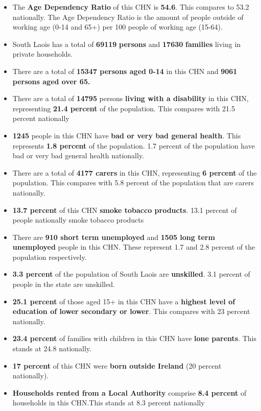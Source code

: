 \documentclass{article}
\begin{document}
\begin{itemize}

\item The \textbf{Age Dependency Ratio} of this CHN is  \textbf{54.6}. This compares to 53.2 nationally. The Age Dependency Ratio is the amount of people outside of working age (0-14 and 65+) per 100 people of working age (15-64). 

\item South Laois has a total of \textbf{\num{69119}} \textbf{persons} and  \textbf{\num{17630}} \textbf{families} living in private households.

\item There are a total of \textbf{\num{15347} persons aged 0-14} in this CHN and \textbf{\num{9061} persons aged over 65.} 

\item There are a total of \textbf{\num{14795}} persons \textbf{living with a disability} in this CHN, representing \textbf{21.4 percent} of the population. This compares with  21.5 percent nationally

\item \textbf{\num{1245}} people in this CHN have \textbf{bad or very bad general health}. This represents \textbf{1.8 percent} of the population. 1.7 percent of the population have bad or very bad general health nationally. 

\item There are a total of \textbf{\num{4177} carers} in this CHN, representing \textbf{6 percent} of the population. This compares with 5.8 percent of the population that are carers nationally. 

\item \textbf{13.7 percent} of this CHN \textbf{smoke tobacco products}. 13.1 percent of people nationally smoke tobacco products

\item There are \textbf{\num{910} short term unemployed} and \textbf{\num{1505} long term unemployed} people in this CHN. These represent 1.7 and 2.8 percent of the population respectively.

\item  \textbf{3.3 percent} of the population of South Laois are \textbf{unskilled}. 3.1 percent of people in the state are unskilled.

\item \textbf{25.1 percent} of those aged 15+ in this CHN have a \textbf{highest level of education of lower secondary or lower}. This compares with 23 percent nationally. 

\item \textbf{23.4 percent} of families with children in this CHN have \textbf{lone parents}. This stands at 24.8 nationally.

\item \textbf{17 percent} of this CHN were \textbf{born outside Ireland} (20 percent nationally).

\item \textbf{Households rented from a Local Authority} comprise \textbf{8.4 percent} of households in this CHN.This stands at 8.3 percent nationally

\end{itemize}
\end{document}

